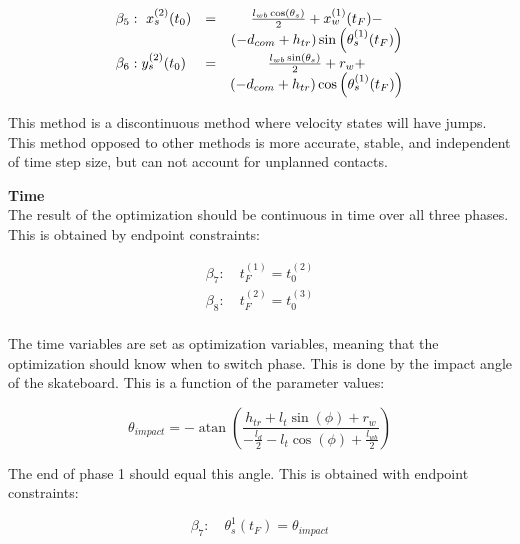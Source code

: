 \documentclass[default,iicol]{sn-jnl}
\theoremstyle{thmstyleone}%
\theoremstyle{thmstyletwo}%
\theoremstyle{thmstylethree}%
\begin{document}
\begin{equation}
\begin{array}{l c c}
\beta_5: \ x_s^{(2)}(t_0) & = & \frac{l_{w b} \cos \left(\theta_s\right)}{2}+x_w^{(1)}(t_F)- \\ 
& & \left(-d_{c o m}+h_{t r}\right) \sin \left(\theta_s^{(1)}(t_F)\right) \\

\beta_6: y_s^{(2)}(t_0) & = & \frac{l_{w b} \sin \left(\theta_s\right)}{2}+r_w+ \\ 
& & \left(-d_{c o m}+h_{t r}\right) \cos \left(\theta_s^{(1)}(t_F)\right)
\end{array}
\end{equation}

This method is a discontinuous method where velocity states will have jumps. This method opposed to other methods is more accurate, stable, and independent of time step size, but can not account for unplanned contacts\cite{ackermann_optimality_2010}. 

\textbf{Time}\\
The result of the optimization should be continuous in time over all three phases. This is obtained by endpoint constraints: 

\begin{equation}
    \begin{array}{c}
         \beta_7: \quad t_F^{(1)} = t_0^{(2)}  \\
         \beta_8: \quad t_F^{(2)} = t_0^{(3)}  \\
    \end{array}
\end{equation}

The time variables are set as optimization variables, meaning that the optimization should know when to switch phase. This is done by the impact angle of the skateboard. This is a function of the parameter values:

\begin{equation}
    \theta_{impact} = -\operatorname{atan}\left(\frac{h_{t r}+l_t \sin (\phi)+r_w}{-\frac{l_d}{2}-l_t \cos (\phi)+\frac{l_{w b}}{2}}\right)
\end{equation}

The end of phase 1 should equal this angle. This is obtained with endpoint constraints:

\begin{equation}
    \beta_7: \quad \theta_s^{1}(t_F) = \theta_{impact}
\end{equation}
\end{document}
